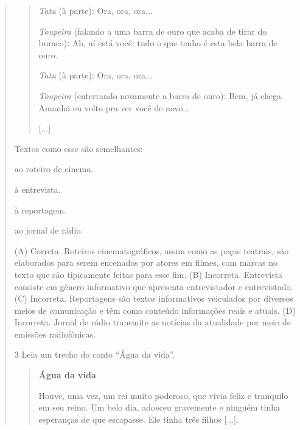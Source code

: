 \begin{boxlist}
\begin{quote}
\begin{quote}
\emph{Tatu} (à parte): Ora, ora, ora...

\emph{Toupeira} (falando a uma barra de ouro que acaba de tirar do
buraco): Ah, aí está você: tudo o que tenho é esta bela barra de ouro.

\emph{Tatu} (à parte): Ora, ora, ora...

\emph{Toupeira} (enterrando novamente a barra de ouro): Bem, já chega.
Amanhã eu volto pra ver você de novo...

{[}...{]}

\end{quote}

Textos como esse são semelhantes:

\begin{escolha}
\item ao roteiro de cinema.

\item à entrevista.

\item à reportagem.

\item ao jornal de rádio.
\end{escolha}


(A) Correta. Roteiros cinematográficos, assim como as peças teatrais,
são elaborados para serem encenados por atores em filmes, com marcas
no texto que são tipicamente feitas para esse fim.
(B) Incorreta. Entrevista consiste em gênero informativo que apresenta
entrevistador e entrevistado.
(C) Incorreta. Reportagens são textos informativos veiculados por
diversos meios de comunicação e têm como conteúdo informações reais e
atuais.
(D) Incorreta. Jornal de rádio transmite as notícias da atualidade por
meio de emissões radiofônicas.

\num{3} Leia um trecho do conto ``Água da vida''.

\begin{quote}
\textbf{Água da vida}

Houve, uma vez, um rei muito poderoso, que vivia feliz e tranquilo em
seu reino. Um belo dia, adoeceu gravemente e ninguém tinha esperanças de
que escapasse. Ele tinha três filhos {[}...{]}.


\end{quote}
\end{quote}
\end{boxlist}
